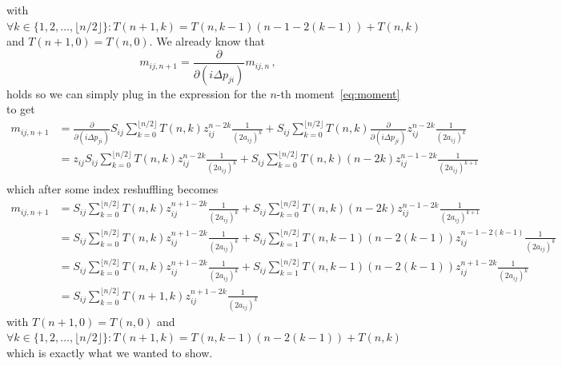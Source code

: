 \documentclass[a4paper, 11pt]{scrartcl}
\begin{document}
with $\forall k \in \{1,2,\ldots, \lfloor n/2 \rfloor\}: T(n+1,k) = T(n, k-1) (n-1 - 2(k-1)) + T(n,k)$ and $T(n+1, 0) = T(n,0)$. 
We already know that
\begin{equation}
    m_{ij, n+1} = \frac{\partial}{\partial (i\Delta p_{ji})} m_{ij, n}\,, 
\end{equation}
holds so we can simply plug in the expression for the $n$-th moment~\eqref{eq:moment} to get
\begin{align*}
    m_{ij, n+1} &= \frac{\partial}{\partial (i\Delta p_{ji})} S_{ij} \sum_{k=0}^{\lfloor n/2 \rfloor} 
    T(n, k) z_{ij}^{n-2k} \frac{1}{(2 a_{ij})^k} 
    + S_{ij} \sum_{k=0}^{\lfloor n/2 \rfloor}  T(n, k) \frac{\partial}{\partial (i\Delta p_{ji})} 
    z_{ij}^{n-2k} \frac{1}{(2 a_{ij})^k} \\
    &= z_{ij} S_{ij} \sum_{k=0}^{\lfloor n/2 \rfloor} 
    T(n, k) z_{ij}^{n-2k} \frac{1}{(2 a_{ij})^k} 
    + S_{ij} \sum_{k=0}^{\lfloor n/2 \rfloor}  T(n, k) (n-2k) z_{ij}^{n-1-2k} \frac{1}{(2 a_{ij})^{k+1}} \\
\end{align*}
which after some index reshuffling becomes 
\begin{align}   
    \nonumber
    m_{ij, n+1} 
    &= S_{ij} \sum_{k=0}^{\lfloor n/2 \rfloor} 
    T(n, k) z_{ij}^{n+1-2k} \frac{1}{(2 a_{ij})^k} 
    + S_{ij} \sum_{k=0}^{\lfloor n/2 \rfloor}  T(n, k) (n-2k) z_{ij}^{n-1-2k} 
    \frac{1}{(2 a_{ij})^{k+1}} \\
    \nonumber
    &= S_{ij} \sum_{k=0}^{\lfloor n/2 \rfloor} 
    T(n, k) z_{ij}^{n+1-2k} \frac{1}{(2 a_{ij})^k} 
    + S_{ij} \sum_{k=1}^{\lfloor n/2 \rfloor}  T(n, k-1) (n-2(k-1)) z_{ij}^{n-1-2(k-1)} 
    \frac{1}{(2 a_{ij})^{k}}\\
    \nonumber
    &= S_{ij} \sum_{k=0}^{\lfloor n/2 \rfloor} 
    T(n, k) z_{ij}^{n+1-2k} \frac{1}{(2 a_{ij})^k} 
    + S_{ij} \sum_{k=1}^{\lfloor n/2 \rfloor}  T(n, k-1) (n-2(k-1)) z_{ij}^{n+1-2k} 
    \frac{1}{(2 a_{ij})^{k}}\\
    &= S_{ij} \sum_{k=0}^{\lfloor n/2 \rfloor}  T(n+1, k) z_{ij}^{n+1-2k} \frac{1}{(2 a_{ij})^k}
\end{align}
with $T(n+1,0)=T(n,0)$ and $\forall k \in \{1,2,\ldots, \lfloor n/2 \rfloor\}: T(n+1, k) = T(n, k-1)
(n - 2(k-1)) + T(n,k)$ which is exactly what we wanted to show.  
\end{document}
